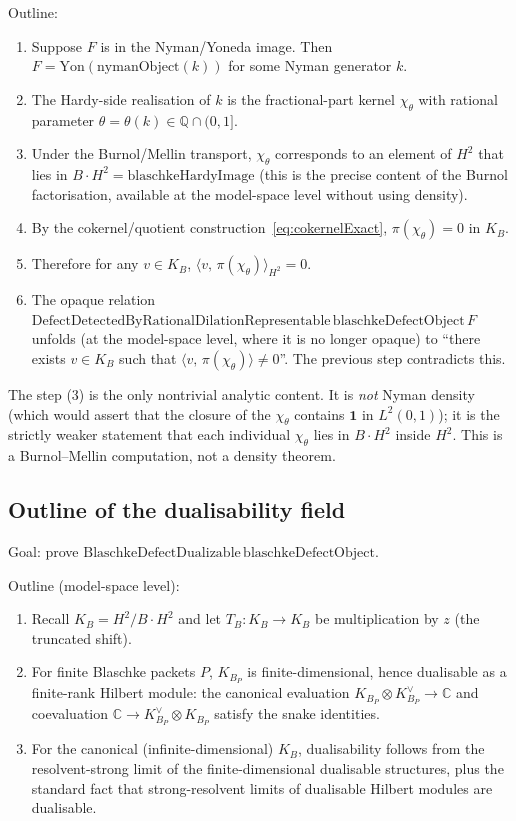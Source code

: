 \documentclass[12pt]{article}
\theoremstyle{definition}
\theoremstyle{remark}
\newcommand{\BS}{B}
\newcommand{\KB}{K_{B}}
\newcommand{\KBP}{K_{B_{P}}}
\newcommand{\C}{\mathbb{C}}
\newcommand{\inn}[2]{\langle #1,\, #2 \rangle}
\newcommand{\Yon}{\mathrm{Yon}}
\begin{document}
Outline:
\begin{enumerate}
  \item Suppose $F$ is in the Nyman/Yoneda image. Then $F = \Yon(\mathrm{nymanObject}(k))$ for some Nyman generator $k$.
  \item The Hardy-side realisation of $k$ is the fractional-part kernel $\chi_{\theta}$ with rational parameter $\theta = \theta(k) \in \mathbb{Q} \cap (0, 1]$.
  \item Under the Burnol/Mellin transport, $\chi_{\theta}$ corresponds to an element of $H^{2}$ that lies in $\BS \cdot H^{2} = \mathrm{blaschkeHardyImage}$ (this is the precise content of the Burnol factorisation, available at the model-space level without using density).
  \item By the cokernel/quotient construction~\eqref{eq:cokernelExact}, $\pi(\chi_{\theta}) = 0$ in $\KB$.
  \item Therefore for any $v \in \KB$, $\inn{v}{\pi(\chi_{\theta})}_{H^{2}} = 0$.
  \item The opaque relation $\mathrm{DefectDetectedByRationalDilationRepresentable}\,\mathrm{blaschkeDefectObject}\,F$ unfolds (at the model-space level, where it is no longer opaque) to ``there exists $v \in \KB$ such that $\inn{v}{\pi(\chi_{\theta})} \ne 0$''. The previous step contradicts this.
\end{enumerate}

The step (3) is the only nontrivial analytic content. It is \emph{not} Nyman density (which would assert that the closure of the $\chi_{\theta}$ contains $\mathbf{1}$ in $L^{2}(0,1)$); it is the strictly weaker statement that each individual $\chi_{\theta}$ lies in $\BS \cdot H^{2}$ inside $H^{2}$. This is a Burnol--Mellin computation, not a density theorem.

\subsection{Outline of the dualisability field}

Goal: prove $\mathrm{BlaschkeDefectDualizable}\,\mathrm{blaschkeDefectObject}$.

Outline (model-space level):
\begin{enumerate}
  \item Recall $\KB = H^{2} / \BS \cdot H^{2}$ and let $T_{\BS} : \KB \to \KB$ be multiplication by $z$ (the truncated shift).
  \item For finite Blaschke packets $P$, $\KBP$ is finite-dimensional, hence dualisable as a finite-rank Hilbert module: the canonical evaluation $\KBP \otimes \KBP^{\vee} \to \C$ and coevaluation $\C \to \KBP^{\vee} \otimes \KBP$ satisfy the snake identities.
  \item For the canonical (infinite-dimensional) $\KB$, dualisability follows from the resolvent-strong limit of the finite-dimensional dualisable structures, plus the standard fact that strong-resolvent limits of dualisable Hilbert modules are dualisable.
\end{enumerate}
\end{document}
